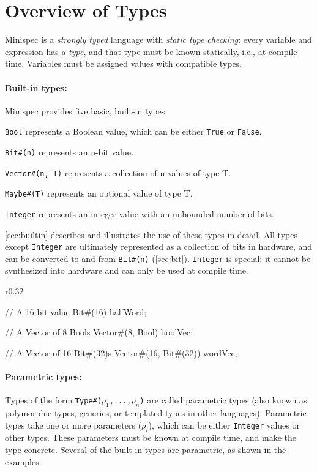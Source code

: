 \section{Overview of Types}
\label{sec:types}

Minispec is a \emph{strongly typed} language with \emph{static type checking}:
every variable and expression has a \emph{type},
and that type must be known statically, i.e., at compile time.
Variables must be assigned values with compatible types.

\paragraph{Built-in types:} Minispec provides five basic, built-in types:
\begin{compactitem}
\item \texttt{Bool} represents a Boolean value, which can be either \texttt{True} or \texttt{False}.
\item \texttt{Bit\#(n)} represents an n-bit value.
\item \texttt{Vector\#(n, T)} represents a collection of n values of type T.
\item \texttt{Maybe\#(T)} represents an optional value of type T.
\item \texttt{Integer} represents an integer value with an unbounded number of bits.
\end{compactitem}
\autoref{sec:builtin} describes and illustrates the use of these types in detail.
All types except \texttt{Integer} are ultimately represented as a collection of bits in hardware,
and can be converted to and from \texttt{Bit\#(n)} (\autoref{sec:bit}).
\texttt{Integer} is special: it cannot be synthesized into hardware
and can only be used at compile time.

\begin{wrapfigure}{r}{0.32\columnwidth}
\vspace{-2.8em}
\begin{mscode}
// A 16-bit value
Bit#(16) halfWord;

// A Vector of 8 Bools
Vector#(8, Bool) boolVec;

// A Vector of 16 Bit#(32)s
Vector#(16, Bit#(32)) wordVec;
\end{mscode}
\vspace{-2em}
\end{wrapfigure}

\paragraph{Parametric types:} Types of the form \texttt{Type\#($\rho_1$,...,$\rho_n$)} are called parametric types
(also known as polymorphic types, generics, or templated types in other languages).
Parametric types take one or more parameters ($\rho_i$), which can be either \texttt{Integer} values or other types.
These parameters must be known at compile time, and make the type concrete.
Several of the built-in types are parametric, as shown in the examples.

